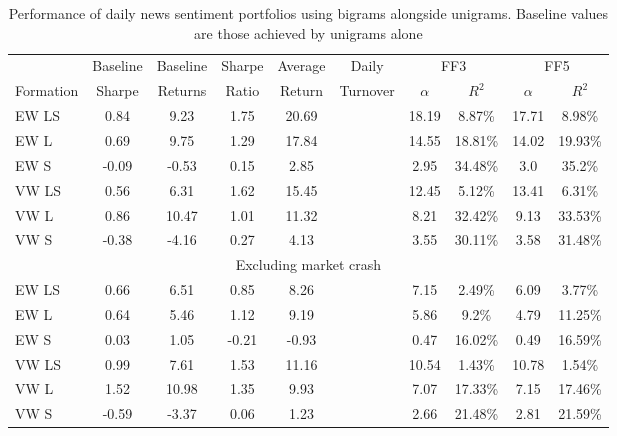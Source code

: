 \begin{table}[!ht]
\begin{center}
\begin{tabular}{l|cc|ccccccc}
      \toprule
      & Baseline & Baseline& Sharpe &  Average & Daily & \multicolumn{2}{c}{FF3} & \multicolumn{2}{c}{FF5} \\
      \cmidrule(lr){7-8}
      \cmidrule(lr){9-10}
      Formation & Sharpe & Returns & Ratio & Return & Turnover & $\alpha$ & $R^2$ & $\alpha$ & $R^2$ \\
      \midrule
 EW LS & 0.84  & 9.23 & 1.75 & 20.69 & & 18.19 & 8.87\% & 17.71 & 8.98\% \\
 EW L  & 0.69  & 9.75 & 1.29 & 17.84 & & 14.55 & 18.81\% & 14.02 & 19.93\% \\
 EW S  & -0.09 & -0.53 & 0.15 & 2.85 & & 2.95 & 34.48\% & 3.0 & 35.2\% \\
 VW LS & 0.56  & 6.31 & 1.62 & 15.45 & & 12.45 & 5.12\% & 13.41 & 6.31\% \\
 VW L  & 0.86  & 10.47 & 1.01 & 11.32 & & 8.21 & 32.42\% & 9.13 & 33.53\% \\
 VW S  & -0.38 & -4.16 & 0.27 & 4.13 & & 3.55 & 30.11\% & 3.58 & 31.48\% \\
 \midrule
 \multicolumn{10}{c}{Excluding market crash} \\
 \midrule
 EW LS & 0.66  & 6.51 & 0.85 & 8.26 & & 7.15 & 2.49\% & 6.09 & 3.77\% \\
 EW L  & 0.64  & 5.46 & 1.12 & 9.19 & & 5.86 & 9.2\% & 4.79 & 11.25\% \\
 EW S  & 0.03  & 1.05 & -0.21 & -0.93 & & 0.47 & 16.02\% & 0.49 & 16.59\% \\
 VW LS & 0.99  & 7.61 & 1.53 & 11.16 & & 10.54 & 1.43\% & 10.78 & 1.54\% \\
 VW L  & 1.52  & 10.98 & 1.35 & 9.93 & & 7.07 & 17.33\% & 7.15 & 17.46\% \\
 VW S  & -0.59 & -3.37 & 0.06 & 1.23 & & 2.66 & 21.48\% & 2.81 & 21.59\% \\
      \bottomrule
\end{tabular}
\caption[Day ahead performance with bigrams]{Performance of daily news sentiment portfolios using bigrams alongside unigrams. Baseline values are those achieved by unigrams alone}
\label{tab:other-configs-day-ahead}
\end{center}
\end{table}

